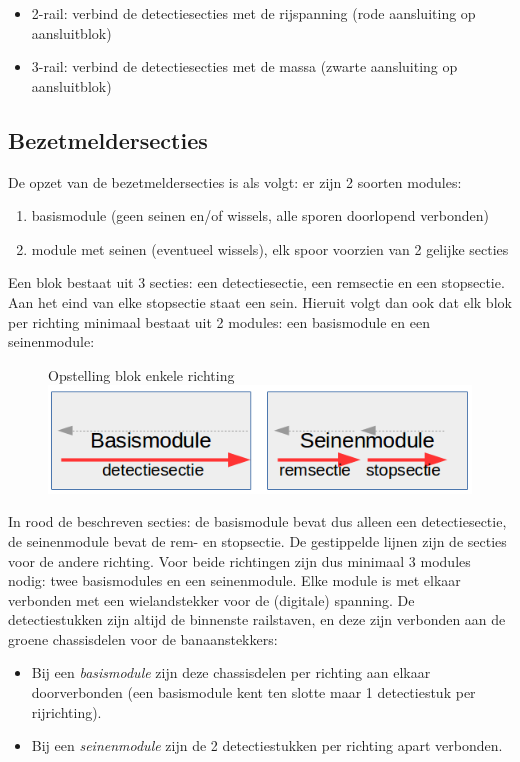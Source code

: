 \documentclass[12pt,a4paper]{report}
\begin{document}
\begin{itemize}
\item 2-rail: verbind de detectiesecties met de rijspanning (rode aansluiting op aansluitblok)
\item 3-rail: verbind de detectiesecties met de massa (zwarte aansluiting op aansluitblok)
\end{itemize}

\subsection{Bezetmeldersecties}
De opzet van de bezetmeldersecties is als volgt:
er zijn 2 soorten modules:

\begin{enumerate}
\item basismodule (geen seinen en/of wissels, alle sporen doorlopend verbonden)
\item module met seinen (eventueel wissels), elk spoor voorzien van 2 gelijke secties
\end{enumerate}

Een blok bestaat uit 3 secties: een detectiesectie, een remsectie en een stopsectie. Aan het eind van elke stopsectie staat een sein. Hieruit volgt dan ook dat elk blok per richting minimaal bestaat uit 2 modules: een basismodule en een seinenmodule:

\begin{figure}[!ht]
  \captionbox
  {Opstelling blok enkele richting\label{im:3secties}}
  {\includegraphics[scale=1.0]{images/rcu_3_secties}}
\end{figure}

In rood de beschreven secties: de basismodule bevat dus alleen een detectiesectie, de seinenmodule bevat de rem- en stopsectie. De gestippelde lijnen zijn de secties voor de andere richting.
Voor beide richtingen zijn dus minimaal 3 modules nodig: twee basismodules en een seinenmodule.
Elke module is met elkaar verbonden met een wielandstekker voor de (digitale) spanning. De detectiestukken zijn altijd de binnenste railstaven, en deze zijn verbonden aan de groene chassisdelen voor de banaanstekkers:
\begin{itemize}
\item Bij een \emph{basismodule} zijn deze chassisdelen per richting aan elkaar doorverbonden (een basismodule kent ten slotte maar 1 detectiestuk per rijrichting).
\item Bij een \emph{seinenmodule} zijn de 2 detectiestukken per richting apart verbonden.
\end{itemize}
\end{document}
